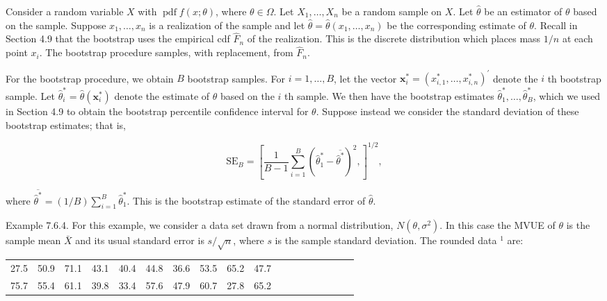 Consider a random variable $X$ with $\operatorname{pdf} f(x ; \theta)$, where $\theta \in \Omega$. Let $X_{1}, \ldots, X_{n}$ be a random sample on $X$. Let $\hat{\theta}$ be an estimator of $\theta$ based on the sample. Suppose $x_{1}, \ldots, x_{n}$ is a realization of the sample and let $\hat{\theta}=\hat{\theta}\left(x_{1}, \ldots, x_{n}\right)$ be the corresponding estimate of $\theta$. Recall in Section 4.9 that the bootstrap uses the empirical cdf $\hat{F}_{n}$ of the realization. This is the discrete distribution which places mass $1 / n$ at each point $x_{i}$. The bootstrap procedure samples, with replacement, from $\hat{F}_{n}$.

For the bootstrap procedure, we obtain $B$ bootstrap samples. For $i=1, \ldots, B$, let the vector $\mathbf{x}_{i}^{*}=\left(x_{i, 1}^{*}, \ldots, x_{i, n}^{*}\right)^{\prime}$ denote the $i$ th bootstrap sample. Let $\hat{\theta}_{i}^{*}=\hat{\theta}\left(\mathbf{x}_{i}^{*}\right)$ denote the estimate of $\theta$ based on the $i$ th sample. We then have the bootstrap estimates $\hat{\theta}_{1}^{*}, \ldots, \hat{\theta}_{B}^{*}$, which we used in Section 4.9 to obtain the bootstrap percentile confidence interval for $\theta$. Suppose instead we consider the standard deviation of these bootstrap estimates; that is,


\begin{equation*}
\mathrm{SE}_{B}=\left[\frac{1}{B-1} \sum_{i=1}^{B}\left(\hat{\theta}_{1}^{*}-\overline{\hat{\theta}^{*}}\right)^{2},\right]^{1 / 2}, \tag{7.6.3}
\end{equation*}


where $\overline{\hat{\theta}^{*}}=(1 / B) \sum_{i=1}^{B} \hat{\theta}_{1}^{*}$. This is the bootstrap estimate of the standard error of $\hat{\theta}$.

Example 7.6.4. For this example, we consider a data set drawn from a normal distribution, $N\left(\theta, \sigma^{2}\right)$. In this case the MVUE of $\theta$ is the sample mean $\bar{X}$ and its usual standard error is $s / \sqrt{n}$, where $s$ is the sample standard deviation. The rounded data ${ }^{1}$ are:

\begin{center}
\begin{tabular}{llllllllllllllllll}
27.5 & 50.9 & 71.1 & 43.1 & 40.4 & 44.8 & 36.6 & 53.5 & 65.2 & 47.7 \\
75.7 & 55.4 & 61.1 & 39.8 & 33.4 & 57.6 & 47.9 & 60.7 & 27.8 & 65.2 \\
\end{tabular}
\end{center}

